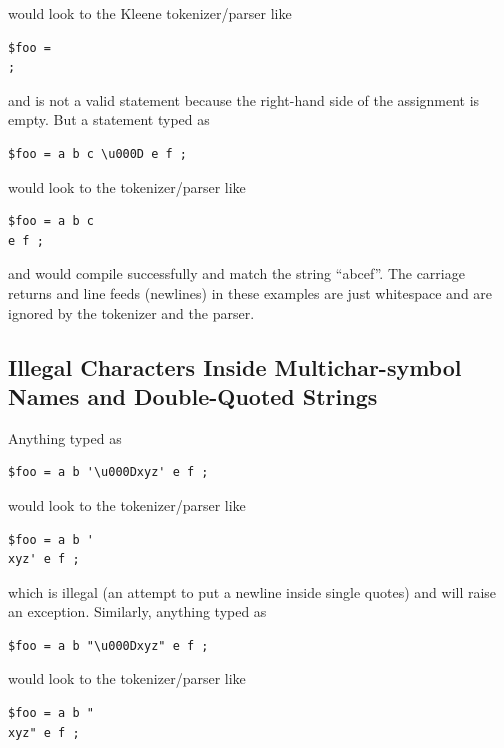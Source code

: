\documentclass[letterpaper,12pt]{article}
\begin{document}
\noindent
would look to the Kleene tokenizer/parser like

\begin{Verbatim}[fontsize=\small]
$foo =
;
\end{Verbatim}

\noindent
and is not a valid statement because the right-hand side of the assignment is
empty.  But a statement typed as

\begin{Verbatim}[fontsize=\small]
$foo = a b c \u000D e f ;
\end{Verbatim}

\noindent
would look to the tokenizer/parser like

\begin{Verbatim}[fontsize=\small]
$foo = a b c
e f ;
\end{Verbatim}

\noindent
and would compile successfully and match the string ``abcef''.  The carriage
returns and line feeds (newlines) in these examples are just whitespace and
are ignored by the tokenizer and the parser.

\subsection{Illegal Characters Inside Multichar-symbol Names and
Double-Quoted Strings}

Anything typed as 

\begin{Verbatim}[fontsize=\small]
$foo = a b '\u000Dxyz' e f ;
\end{Verbatim}

\noindent
would look to the tokenizer/parser like

\begin{Verbatim}[fontsize=\small]
$foo = a b '
xyz' e f ;
\end{Verbatim}

\noindent
which is illegal (an attempt to put a newline inside single quotes) and will
raise an exception.  Similarly, anything typed as

\begin{Verbatim}[fontsize=\small]
$foo = a b "\u000Dxyz" e f ;
\end{Verbatim}

\noindent
would look to the tokenizer/parser like

\begin{Verbatim}[fontsize=\small]
$foo = a b "
xyz" e f ;
\end{Verbatim}
\end{document}
